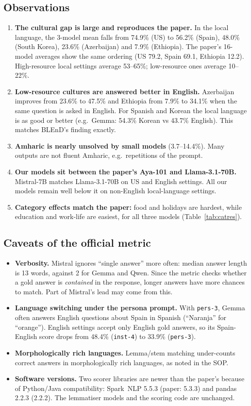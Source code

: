 \documentclass[11pt]{article}
\begin{document}
\subsection{Observations}
\begin{enumerate}
\item \textbf{The cultural gap is large and reproduces the paper.} In the local language, the
3-model mean falls from 74.9\% (US) to 56.2\% (Spain), 48.0\% (South Korea), 23.6\% (Azerbaijan) and
7.9\% (Ethiopia). The paper's 16-model averages show the same ordering (US 79.2, Spain 69.1, Ethiopia
12.2). High-resource local settings average 53--65\%; low-resource ones average 10--22\%.
\item \textbf{Low-resource cultures are answered better in English.} Azerbaijan improves from 23.6\%
to 47.5\% and Ethiopia from 7.9\% to 34.1\% when the same question is asked in English. For Spanish
and Korean the local language is as good or better (e.g.\ Gemma: 54.3\% Korean vs 43.7\% English).
This matches BLEnD's finding exactly.
\item \textbf{Amharic is nearly unsolved by small models} (3.7--14.4\%). Many outputs are not fluent
Amharic, e.g.\ repetitions of the prompt.
\item \textbf{Our models sit between the paper's Aya-101 and Llama-3.1-70B.} Mistral-7B matches
Llama-3.1-70B on US and English settings. All our models remain well below it on non-English
local-language settings.
\item \textbf{Category effects match the paper:} food and holidays are hardest, while education and
work-life are easiest, for all three models (Table~\ref{tab:catres}).
\end{enumerate}

\subsection{Caveats of the official metric}
\begin{itemize}
\item \textbf{Verbosity.} Mistral ignores ``single answer'' more often: median answer length is 13
words, against 2 for Gemma and Qwen. Since the metric checks whether a gold answer is \emph{contained}
in the response, longer answers have more chances to match. Part of Mistral's lead may come from this.
\item \textbf{Language switching under the persona prompt.} With \texttt{pers-3}, Gemma often answers
English questions about Spain in Spanish (``Naranja'' for ``orange''). English settings accept only
English gold answers, so its Spain-English score drops from 48.4\% (\texttt{inst-4}) to 33.9\%
(\texttt{pers-3}).
\item \textbf{Morphologically rich languages.} Lemma/stem matching under-counts correct answers in
morphologically rich languages, as noted in the SOP.
\item \textbf{Software versions.} Two scorer libraries are newer than the paper's because of
Python/Java compatibility: Spark~NLP 5.5.3 (paper: 5.3.3) and pandas 2.2.3 (2.2.2). The lemmatiser
models and the scoring code are unchanged.
\end{itemize}
\end{document}
